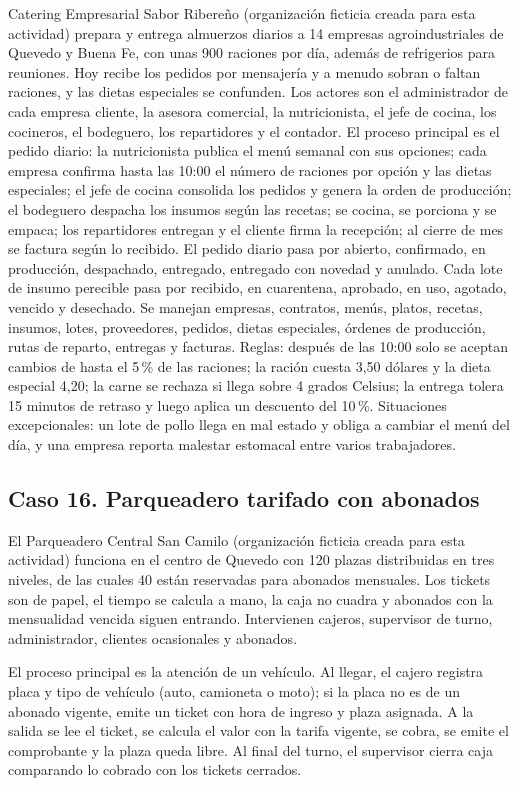 \documentclass[11pt]{article}
\newcommand{\subseccion}[1]{\subsection{\textcolor{midblue}{#1}}}
\begin{document}
Catering Empresarial Sabor Ribereño (organización ficticia creada para esta actividad) prepara y entrega almuerzos diarios a 14 empresas agroindustriales de Quevedo y Buena Fe, con unas 900 raciones por día, además de refrigerios para reuniones. Hoy recibe los pedidos por mensajería y a menudo sobran o faltan raciones, y las dietas especiales se confunden. Los actores son el administrador de cada empresa cliente, la asesora comercial, la nutricionista, el jefe de cocina, los cocineros, el bodeguero, los repartidores y el contador. El proceso principal es el pedido diario: la nutricionista publica el menú semanal con sus opciones; cada empresa confirma hasta las 10:00 el número de raciones por opción y las dietas especiales; el jefe de cocina consolida los pedidos y genera la orden de producción; el bodeguero despacha los insumos según las recetas; se cocina, se porciona y se empaca; los repartidores entregan y el cliente firma la recepción; al cierre de mes se factura según lo recibido. El pedido diario pasa por abierto, confirmado, en producción, despachado, entregado, entregado con novedad y anulado. Cada lote de insumo perecible pasa por recibido, en cuarentena, aprobado, en uso, agotado, vencido y desechado. Se manejan empresas, contratos, menús, platos, recetas, insumos, lotes, proveedores, pedidos, dietas especiales, órdenes de producción, rutas de reparto, entregas y facturas. Reglas: después de las 10:00 solo se aceptan cambios de hasta el 5\,\% de las raciones; la ración cuesta 3,50 dólares y la dieta especial 4,20; la carne se rechaza si llega sobre 4 grados Celsius; la entrega tolera 15 minutos de retraso y luego aplica un descuento del 10\,\%. Situaciones excepcionales: un lote de pollo llega en mal estado y obliga a cambiar el menú del día, y una empresa reporta malestar estomacal entre varios trabajadores.
\subseccion{Caso 16. Parqueadero tarifado con abonados}
El Parqueadero Central San Camilo (organización ficticia creada para esta actividad) funciona en el centro de Quevedo con 120 plazas distribuidas en tres niveles, de las cuales 40 están reservadas para abonados mensuales. Los tickets son de papel, el tiempo se calcula a mano, la caja no cuadra y abonados con la mensualidad vencida siguen entrando. Intervienen cajeros, supervisor de turno, administrador, clientes ocasionales y abonados.

El proceso principal es la atención de un vehículo. Al llegar, el cajero registra placa y tipo de vehículo (auto, camioneta o moto); si la placa no es de un abonado vigente, emite un ticket con hora de ingreso y plaza asignada. A la salida se lee el ticket, se calcula el valor con la tarifa vigente, se cobra, se emite el comprobante y la plaza queda libre. Al final del turno, el supervisor cierra caja comparando lo cobrado con los tickets cerrados.
\end{document}
